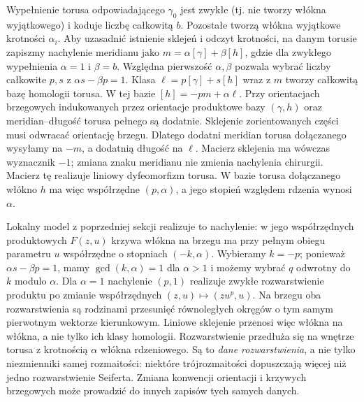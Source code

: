 Wypełnienie torusa odpowiadającego $\gamma_0$ jest zwykłe
(tj. nie tworzy włókna wyjątkowego) i koduje liczbę
całkowitą $b$. Pozostałe tworzą włókna wyjątkowe
krotności $\alpha_i$. Aby uzasadnić istnienie
sklejeń i odczyt krotności, na danym torusie
zapiszmy nachylenie meridianu jako
$m=\alpha[\gamma]+\beta[h]$, gdzie dla zwykłego
wypełnienia $\alpha=1$ i $\beta=b$.
Względna pierwszość $\alpha,\beta$ pozwala
wybrać liczby całkowite $p,s$ z
$\alpha s-\beta p=1$. Klasa
$\ell=p[\gamma]+s[h]$ wraz z $m$ tworzy
całkowitą bazę homologii torusa. W tej bazie $[h]=-p m+\alpha\ell$.
Przy orientacjach brzegowych indukowanych przez
orientacje produktowe bazy $(\gamma,h)$ oraz
meridian--długość torusa pełnego są dodatnie.
Sklejenie zorientowanych części musi odwracać
orientację brzegu. Dlatego dodatni meridian
torusa dołączanego wysyłamy na $-m$, a dodatnią
długość na $\ell$. Macierz sklejenia ma wówczas
wyznacznik $-1$; zmiana znaku meridianu nie
zmienia nachylenia chirurgii. Macierz tę realizuje
liniowy dyfeomorfizm torusa. W bazie torusa
dołączanego włókno $h$ ma więc współrzędne
$(p,\alpha)$, a jego stopień względem rdzenia
wynosi $\alpha$.

Lokalny model z poprzedniej sekcji realizuje
to nachylenie: w jego współrzędnych produktowych
$F(z,u)$ krzywa włókna na brzegu ma przy pełnym
obiegu parametru $u$ współrzędne o stopniach
$(-k,\alpha)$. Wybieramy $k=-p$; ponieważ
$\alpha s-\beta p=1$, mamy $\gcd(k,\alpha)=1$
dla $\alpha>1$ i możemy wybrać $q$ odwrotny
do $k$ modulo $\alpha$.
Dla $\alpha=1$ nachylenie $(p,1)$ realizuje
zwykłe rozwarstwienie produktu po zmianie
współrzędnych $(z,u)\mapsto(zu^p,u)$.
Na brzegu oba rozwarstwienia są rodzinami
przesunięć równoległych okręgów o tym samym
pierwotnym wektorze kierunkowym. Liniowe
sklejenie przenosi więc włókna na włókna,
a nie tylko ich klasy homologii. Rozwarstwienie
przedłuża się na wnętrze torusa z krotnością
$\alpha$ włókna rdzeniowego. Są to \emph{dane rozwarstwienia},
a nie tylko niezmienniki samej rozmaitości: niektóre
trójrozmaitości dopuszczają więcej niż jedno rozwarstwienie
Seiferta. Zmiana konwencji orientacji i krzywych brzegowych
może prowadzić do innych zapisów tych samych danych.

\begin{center}
\end{center}

